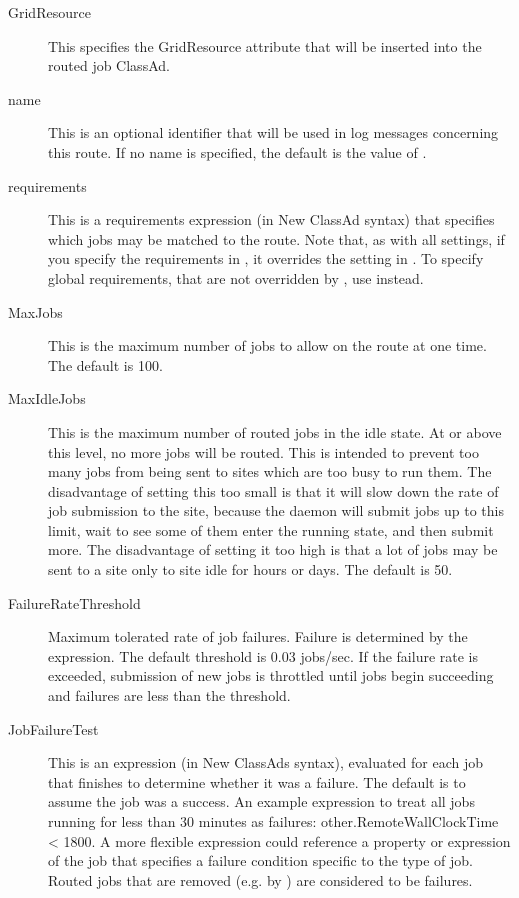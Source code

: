 \begin{description}

\item[GridResource] This specifies the GridResource attribute that
will be inserted into the routed job ClassAd.

\item[name] This is an optional identifier that will be used in log
messages concerning this route.  If no name is specified, the default
is the value of .

\item[requirements] This is a requirements expression (in New ClassAd
syntax) that specifies which jobs may be matched to the route.  Note
that, as with all settings, if you specify the requirements in
, it overrides the setting in
.  To specify global requirements, that
are not overridden by , use
 instead.

\item[MaxJobs] This is the maximum number of jobs to allow on the route at
one time. The default is 100.

\item[MaxIdleJobs] This is the maximum number of routed jobs in the
idle state.  At or above this level, no more jobs will be routed.
This is intended to prevent too many jobs from being sent to sites
which are too busy to run them.  The disadvantage of setting this too
small is that it will slow down the rate of job submission to the
site, because the  daemon will submit jobs up to this limit, wait to see
some of them enter the running state, and then submit more.  The
disadvantage of setting it too high is that a lot of jobs may be sent
to a site only to site idle for hours or days.  The default is 50.

\item[FailureRateThreshold] Maximum tolerated rate of job failures.
Failure is determined by the  expression.  The
default threshold is 0.03 jobs/sec.  If the failure rate is exceeded,
submission of new jobs is throttled until jobs begin succeeding and
failures are less than the threshold.

\item[JobFailureTest] This is an expression (in New ClassAds syntax),
evaluated for each job that finishes to determine whether it was a
failure.  The default is to assume the job was a success.  An example
expression to treat all jobs running for less than 30 minutes as
failures: other.RemoteWallClockTime < 1800.  A more flexible
expression could reference a property or expression of the job that
specifies a failure condition specific to the type of job.  Routed
jobs that are removed (e.g. by ) are considered
to be failures.


\end{description}
